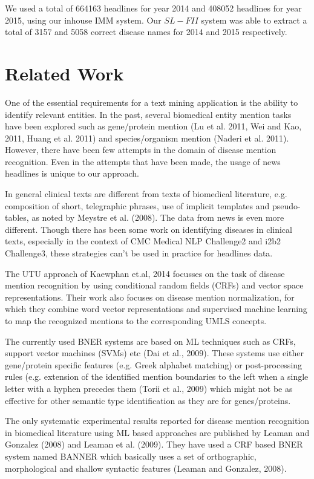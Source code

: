 \documentclass{article}
\begin{document}
We used a total of 664163 headlines for year 2014 and 408052 headlines for year 2015, using our inhouse IMM system. Our $SL-FII$ system was able to extract a total of 3157 and 5058 correct disease names for 2014 and 2015 respectively. 

\section{Related Work}
One of the essential requirements for a text mining application is the ability to identify relevant entities. In the past, several biomedical entity mention tasks have been explored such as gene/protein mention (Lu et al. 2011, Wei and Kao, 2011, Huang et al. 2011) and species/organism mention (Naderi et al. 2011). However, there have been few attempts in the domain of disease mention recognition. Even in the attempts that have been made, the usage of news headlines is unique to our approach.

In general clinical texts are different from texts of biomedical literature, e.g. composition of short, telegraphic phrases, use of implicit templates and pseudo-tables, as noted by Meystre et al. (2008). The data from news is even more different. Though there has been some work on identifying diseases in clinical texts, especially in the context of CMC Medical NLP Challenge2 and i2b2 Challenge3, these strategies can't be used in
practice for headlines data.

The UTU approach of Kaewphan et.al, 2014 focusses on the task of disease mention
recognition by using conditional random fields (CRFs) and vector space representations.
Their work also focuses on disease mention normalization, for which they combine word
vector representations and supervised machine learning to map the recognized
mentions to the corresponding UMLS concepts.

The currently used BNER systems are based on ML techniques such as CRFs, support
vector machines (SVMs) etc (Dai et al., 2009). These systems use either gene/protein
specific features (e.g. Greek alphabet matching) or post-processing rules (e.g. extension
of the identified mention boundaries to the left when a single letter with a hyphen
precedes them (Torii et al., 2009) which might not be as effective for other semantic type identification as they are for genes/proteins.

The only systematic experimental results reported for disease mention recognition in
biomedical literature using ML based approaches are published by Leaman and Gonzalez
(2008) and Leaman et al. (2009). They have used a CRF based BNER system named
BANNER which basically uses a set of orthographic, morphological and shallow syntactic features (Leaman and Gonzalez, 2008). 
\end{document}
